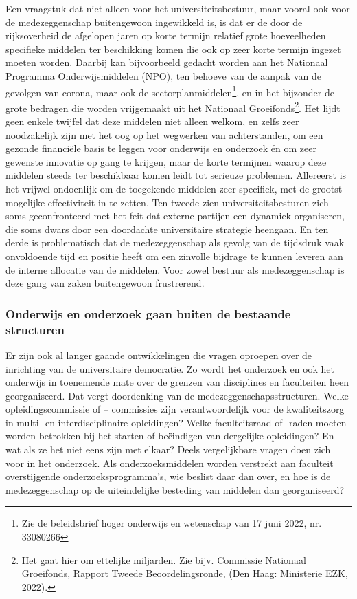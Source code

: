 \documentclass{jote-book}
\begin{document}
	Een vraagstuk dat niet alleen voor het universiteitsbestuur, maar vooral ook voor de medezeggenschap buitengewoon ingewikkeld is, is dat er de door de rijksoverheid de afgelopen jaren op korte termijn relatief grote hoeveelheden specifieke middelen ter beschikking komen die ook op zeer korte termijn ingezet moeten worden. Daarbij kan bijvoorbeeld gedacht worden aan het Nationaal Programma Onderwijsmiddelen (NPO), ten behoeve van de aanpak van de gevolgen van corona, maar ook de sectorplanmiddelen\footnote{Zie de beleidsbrief hoger onderwijs en wetenschap van 17 juni 2022, nr. 33080266}, en in het bijzonder de grote bedragen die worden vrijgemaakt uit het Nationaal Groeifonds\footnote{Het gaat hier om ettelijke miljarden. Zie bijv. Commissie Nationaal Groeifonds, Rapport Tweede Beoordelingsronde, (Den Haag: Ministerie EZK, 2022).}. Het lijdt geen enkele twijfel dat deze middelen niet alleen welkom, en zelfs zeer noodzakelijk zijn met het oog op het wegwerken van achterstanden, om een gezonde financiële basis te leggen voor onderwijs en onderzoek én om zeer gewenste innovatie op gang te krijgen, maar de korte termijnen waarop deze middelen steeds ter beschikbaar komen leidt tot serieuze problemen. Allereerst is het vrijwel ondoenlijk om de toegekende middelen zeer specifiek, met de grootst mogelijke effectiviteit in te zetten. Ten tweede zien universiteitsbesturen zich soms geconfronteerd met het feit dat externe partijen een dynamiek organiseren, die soms dwars door een doordachte universitaire strategie heengaan. En ten derde is problematisch dat de medezeggenschap als gevolg van de tijdsdruk vaak onvoldoende tijd en positie heeft om een zinvolle bijdrage te kunnen leveren aan de interne allocatie van de middelen. Voor zowel bestuur als medezeggenschap is deze gang van zaken buitengewoon frustrerend.



	\subsubsection{Onderwijs en onderzoek gaan buiten de bestaande structuren}



	Er zijn ook al langer gaande ontwikkelingen die vragen oproepen over de inrichting van de universitaire democratie. Zo wordt het onderzoek en ook het onderwijs in toenemende mate over de grenzen van disciplines en faculteiten heen georganiseerd. Dat vergt doordenking van de medezeggenschapsstructuren. Welke opleidingscommissie of -- commissies zijn verantwoordelijk voor de kwaliteitszorg in multi- en interdisciplinaire opleidingen? Welke faculteitsraad of -raden moeten worden betrokken bij het starten of beëindigen van dergelijke opleidingen? En wat als ze het niet eens zijn met elkaar? Deels vergelijkbare vragen doen zich voor in het onderzoek. Als onderzoeksmiddelen worden verstrekt aan faculteit overstijgende onderzoeksprogramma's, wie beslist daar dan over, en hoe is de medezeggenschap op de uiteindelijke besteding van middelen dan georganiseerd?
\end{document}

